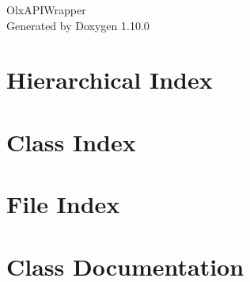 \documentclass[twoside]{book}
\newcommand{\+}{\discretionary{\mbox{\scriptsize$\hookleftarrow$}}{}{}}
\newcommand{\clearemptydoublepage}{%
    \newpage{\pagestyle{empty}\cleardoublepage}%
  }
\begin{document}
  \raggedbottom

  



    \hypersetup{pageanchor=false,
                bookmarksnumbered=true,
                pdfencoding=unicode
               }


  \begin{titlepage}
  \vspace*{7cm}
  \begin{center}%
  {\Large Olx\+APIWrapper}\\

  \vspace*{1cm}
  {\large Generated by Doxygen 1.10.0}\\

  \end{center}
  \end{titlepage}


  \clearemptydoublepage


  \tableofcontents

  \clearemptydoublepage




  \hypersetup{pageanchor=true}





\chapter{Hierarchical Index}

\chapter{Class Index}

\chapter{File Index}

\chapter{Class Documentation}


















\end{document}
